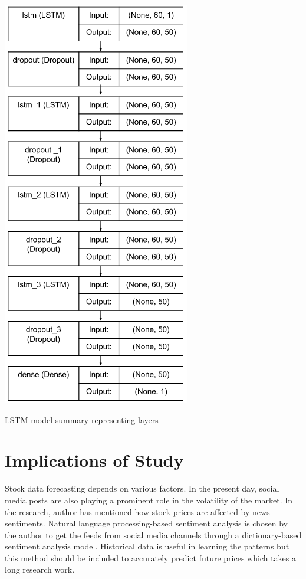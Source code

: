 \begin{center}
    \includegraphics[scale=0.70]{model_summary_01.png}
    \newline
    \caption{LSTM model summary representing layers}
\end{center}

\section{Implications of Study}
Stock data forecasting depends on various factors. In the present day, social media posts are also playing a prominent role in the volatility of the market. In the research, \cite{implications} author has mentioned how stock prices are affected by news sentiments. Natural language processing-based sentiment analysis is chosen by the author to get the feeds from social media channels through a dictionary-based sentiment analysis model. Historical data is useful in learning the patterns but this method should be included to accurately predict future prices which takes a long research work.


